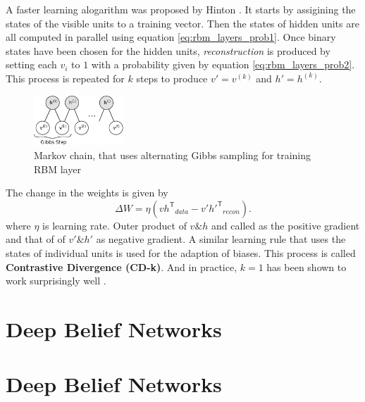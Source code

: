 A faster learning alogarithm was proposed by Hinton \cite{hinton2002training,hinton2006reducing,hinton2010practical}. It starts by assigining the states of the visible units to a training vector. Then the states of hidden units are all computed in parallel using equation \ref{eq:rbm_layers_prob1}. Once binary states have been chosen for the hidden units, \textit{reconstruction} is produced by setting each $v_i$ to $1$ with a probability given by equation \ref{eq:rbm_layers_prob2}. This process is repeated for $k$ steps to produce $v'= v^{(k)}$ and $h' = h^{(k)}$. 

\begin{figure}[ht]
\centering
\includegraphics[width=0.3\textwidth]{./imgs/markov_chain.png}
\caption{Markov chain, that uses alternating Gibbs sampling for training RBM layer}
\label{fig:rbmmarkovChain}
\end{figure}

The change in the weights is given by
$$ \Delta W = \eta ({vh^\mathsf{T}}_{data} - {v'h'^{\mathsf{T}}}_{recon}). $$
where $\eta$ is learning rate. Outer product of $v \& h$ and called as the positive gradient and that of of $v' \& h'$ as negative gradient. A similar learning rule that uses the states of individual units is used for the adaption of biases. This process is called \textbf{Contrastive Divergence (CD-k)}. And in practice, $k=1$ has been shown to work surprisingly well \cite{hinton2010practical}.

\section{Deep Belief Networks}

\section{Deep Belief Networks}

